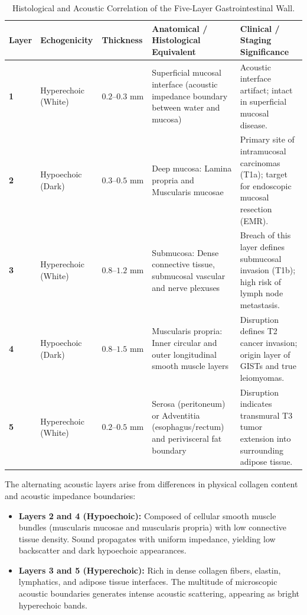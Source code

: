 \documentclass[11pt,a4paper]{article}
\begin{document}
\begin{table}[htbp]
\centering
\small
\setlength{\tabcolsep}{2.5pt}
\caption{Histological and Acoustic Correlation of the Five-Layer Gastrointestinal Wall.}
\label{tab:five_layers}
\begin{tabular}{p{1.0cm} p{2.5cm} p{2.0cm} p{4.5cm} p{4.5cm}}
\toprule
\textbf{Layer} & \textbf{Echogenicity} & \textbf{Thickness} & \textbf{Anatomical / Histological Equivalent} & \textbf{Clinical / Staging Significance} \\
\midrule
\textbf{1} & Hyperechoic (White) & $0.2\text{--}0.3\text{ mm}$ & Superficial mucosal interface (acoustic impedance boundary between water and mucosa) & Acoustic interface artifact; intact in superficial mucosal disease. \\
\addlinespace
\textbf{2} & Hypoechoic (Dark) & $0.3\text{--}0.5\text{ mm}$ & Deep mucosa: Lamina propria and Muscularis mucosae & Primary site of intramucosal carcinomas (T1a); target for endoscopic mucosal resection (EMR). \\
\addlinespace
\textbf{3} & Hyperechoic (White) & $0.8\text{--}1.2\text{ mm}$ & Submucosa: Dense connective tissue, submucosal vascular and nerve plexuses & Breach of this layer defines submucosal invasion (T1b); high risk of lymph node metastasis. \\
\addlinespace
\textbf{4} & Hypoechoic (Dark) & $0.8\text{--}1.5\text{ mm}$ & Muscularis propria: Inner circular and outer longitudinal smooth muscle layers & Disruption defines T2 cancer invasion; origin layer of GISTs and true leiomyomas. \\
\addlinespace
\textbf{5} & Hyperechoic (White) & $0.2\text{--}0.5\text{ mm}$ & Serosa (peritoneum) or Adventitia (esophagus/rectum) and perivisceral fat boundary & Disruption indicates transmural T3 tumor extension into surrounding adipose tissue. \\
\bottomrule
\end{tabular}
\end{table}

\begin{physicsbox}
The alternating acoustic layers arise from differences in physical collagen content and acoustic impedance boundaries:
\begin{itemize}[leftmargin=1.5em]
    \item \textbf{Layers 2 and 4 (Hypoechoic):} Composed of cellular smooth muscle bundles (muscularis mucosae and muscularis propria) with low connective tissue density. Sound propagates with uniform impedance, yielding low backscatter and dark hypoechoic appearances.
    \item \textbf{Layers 3 and 5 (Hyperechoic):} Rich in dense collagen fibers, elastin, lymphatics, and adipose tissue interfaces. The multitude of microscopic acoustic boundaries generates intense acoustic scattering, appearing as bright hyperechoic bands.
\end{itemize}
\end{physicsbox}
\end{document}
